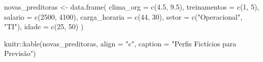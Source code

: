 \documentclass[
  letterpaper,
  DIV=11,
  numbers=noendperiod]{scrartcl}
\newenvironment{Shaded}{\begin{snugshade}}{\end{snugshade}}
\newcommand{\AttributeTok}[1]{\textcolor[rgb]{0.40,0.45,0.13}{#1}}
\newcommand{\DecValTok}[1]{\textcolor[rgb]{0.68,0.00,0.00}{#1}}
\newcommand{\FloatTok}[1]{\textcolor[rgb]{0.68,0.00,0.00}{#1}}
\newcommand{\FunctionTok}[1]{\textcolor[rgb]{0.28,0.35,0.67}{#1}}
\newcommand{\NormalTok}[1]{\textcolor[rgb]{0.00,0.23,0.31}{#1}}
\newcommand{\OtherTok}[1]{\textcolor[rgb]{0.00,0.23,0.31}{#1}}
\newcommand{\SpecialCharTok}[1]{\textcolor[rgb]{0.37,0.37,0.37}{#1}}
\newcommand{\StringTok}[1]{\textcolor[rgb]{0.13,0.47,0.30}{#1}}
\begin{document}
\begin{Shaded}
\begin{Highlighting}[]
\NormalTok{novas\_preditoras }\OtherTok{\textless{}{-}} \FunctionTok{data.frame}\NormalTok{(}
  \AttributeTok{clima\_org =} \FunctionTok{c}\NormalTok{(}\FloatTok{4.5}\NormalTok{, }\FloatTok{9.5}\NormalTok{), }
  \AttributeTok{treinamentos =} \FunctionTok{c}\NormalTok{(}\DecValTok{1}\NormalTok{, }\DecValTok{5}\NormalTok{),              }
  \AttributeTok{salario =} \FunctionTok{c}\NormalTok{(}\DecValTok{2500}\NormalTok{, }\DecValTok{4100}\NormalTok{),         }
  \AttributeTok{carga\_horaria =} \FunctionTok{c}\NormalTok{(}\DecValTok{44}\NormalTok{, }\DecValTok{30}\NormalTok{),          }
  \AttributeTok{setor =} \FunctionTok{c}\NormalTok{(}\StringTok{"Operacional"}\NormalTok{, }\StringTok{"TI"}\NormalTok{),}
  \AttributeTok{idade =} \FunctionTok{c}\NormalTok{(}\DecValTok{25}\NormalTok{, }\DecValTok{50}\NormalTok{)                   }
\NormalTok{)}

\NormalTok{knitr}\SpecialCharTok{::}\FunctionTok{kable}\NormalTok{(novas\_preditoras, }\AttributeTok{align =} \StringTok{"c"}\NormalTok{, }\AttributeTok{caption =} \StringTok{"Perfis Fictícios para Previsão"}\NormalTok{)}
\end{Highlighting}
\end{Shaded}
\end{document}
